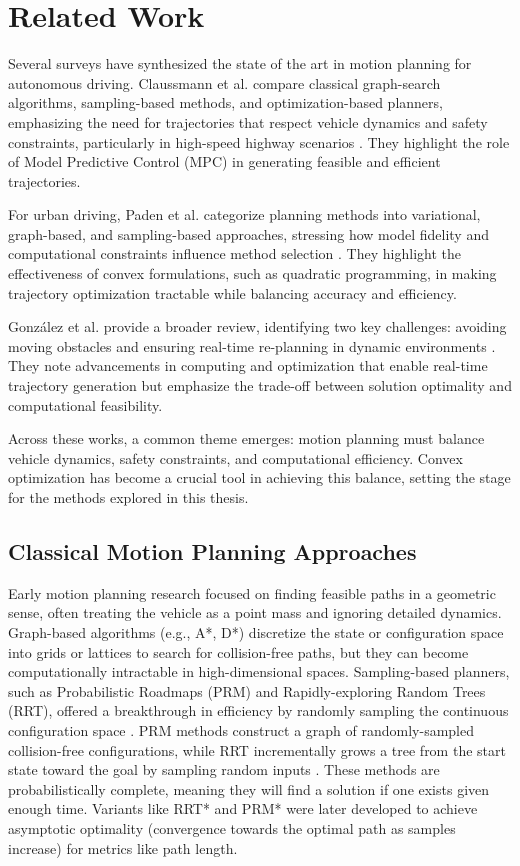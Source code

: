 \section{Related Work} \label{sec:related_work}

Several surveys have synthesized the state of the art in motion planning for autonomous driving.
Claussmann et al.
compare classical graph-search algorithms, sampling-based methods, and optimization-based planners, emphasizing the need for trajectories that respect vehicle dynamics and safety constraints, particularly in high-speed highway scenarios \cite{claussmann_review_2020}.
They highlight the role of Model Predictive Control (MPC) in generating feasible and efficient trajectories.

For urban driving, Paden et al.
categorize planning methods into variational, graph-based, and sampling-based approaches, stressing how model fidelity and computational constraints influence method selection \cite{paden_survey_2016}.
They highlight the effectiveness of convex formulations, such as quadratic programming, in making trajectory optimization tractable while balancing
accuracy and efficiency.

González et al.
provide a broader review, identifying two key challenges: avoiding moving obstacles and ensuring real-time re-planning in dynamic environments \cite{gonzalez_bautista_review_2015}.
They note advancements in computing and optimization that enable real-time trajectory generation but emphasize the trade-off between solution
optimality and computational feasibility.

Across these works, a common theme emerges: motion planning must balance vehicle dynamics, safety constraints, and computational efficiency.
Convex optimization has become a crucial tool in achieving this balance, setting the stage for the methods explored in this thesis.
\subsection{Classical Motion Planning Approaches}

Early motion planning research focused on finding feasible paths in a geometric sense, often treating the vehicle as a point mass and ignoring
detailed dynamics.
Graph-based algorithms (e.g., A*, D*) discretize the state or configuration space into grids or lattices to search for collision-free paths, but they
can become computationally intractable in high-dimensional spaces.
Sampling-based planners, such as Probabilistic Roadmaps (PRM) and Rapidly-exploring Random Trees (RRT), offered a breakthrough in efficiency by
randomly sampling the continuous configuration space \cite{orthey_sampling-based_2024}.
PRM methods construct a graph of randomly-sampled collision-free configurations, while RRT incrementally grows a tree from the start state toward the
goal by sampling random inputs \cite{orthey_sampling-based_2024}.
These methods are probabilistically complete, meaning they will find a solution if one exists given enough time.
Variants like RRT* and PRM* were later developed to achieve asymptotic optimality (convergence towards the optimal path as samples increase) for
metrics like path length.

